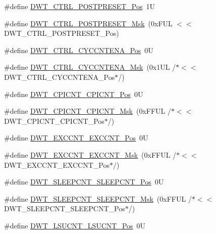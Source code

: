 \begin{DoxyCompactItemize}
\item 
\#define \mbox{\hyperlink{group__CMSIS__DWT_ga129bc152febfddd67a0c20c6814cba69}{D\+W\+T\+\_\+\+C\+T\+R\+L\+\_\+\+P\+O\+S\+T\+P\+R\+E\+S\+E\+T\+\_\+\+Pos}}~1U
\item 
\#define \mbox{\hyperlink{group__CMSIS__DWT_ga11d9e1e2a758fdd2657aa68ce61b9c9d}{D\+W\+T\+\_\+\+C\+T\+R\+L\+\_\+\+P\+O\+S\+T\+P\+R\+E\+S\+E\+T\+\_\+\+Msk}}~(0x\+F\+U\+L $<$$<$ D\+W\+T\+\_\+\+C\+T\+R\+L\+\_\+\+P\+O\+S\+T\+P\+R\+E\+S\+E\+T\+\_\+\+Pos)
\item 
\#define \mbox{\hyperlink{group__CMSIS__DWT_gaa4509f5f8514a7200be61691f0e01f10}{D\+W\+T\+\_\+\+C\+T\+R\+L\+\_\+\+C\+Y\+C\+C\+N\+T\+E\+N\+A\+\_\+\+Pos}}~0U
\item 
\#define \mbox{\hyperlink{group__CMSIS__DWT_ga4a9d209dc2a81ea6bfa0ea21331769d3}{D\+W\+T\+\_\+\+C\+T\+R\+L\+\_\+\+C\+Y\+C\+C\+N\+T\+E\+N\+A\+\_\+\+Msk}}~(0x1\+U\+L /$\ast$$<$$<$ D\+W\+T\+\_\+\+C\+T\+R\+L\+\_\+\+C\+Y\+C\+C\+N\+T\+E\+N\+A\+\_\+\+Pos$\ast$/)
\item 
\#define \mbox{\hyperlink{group__CMSIS__DWT_ga80e9ad8f6a9e2344af8a3cf989bebe3d}{D\+W\+T\+\_\+\+C\+P\+I\+C\+N\+T\+\_\+\+C\+P\+I\+C\+N\+T\+\_\+\+Pos}}~0U
\item 
\#define \mbox{\hyperlink{group__CMSIS__DWT_ga76f39e7bca3fa86a4dbf7b8f6adb7217}{D\+W\+T\+\_\+\+C\+P\+I\+C\+N\+T\+\_\+\+C\+P\+I\+C\+N\+T\+\_\+\+Msk}}~(0x\+F\+F\+U\+L /$\ast$$<$$<$ D\+W\+T\+\_\+\+C\+P\+I\+C\+N\+T\+\_\+\+C\+P\+I\+C\+N\+T\+\_\+\+Pos$\ast$/)
\item 
\#define \mbox{\hyperlink{group__CMSIS__DWT_ga031c693654030d4cba398b45d2925b1d}{D\+W\+T\+\_\+\+E\+X\+C\+C\+N\+T\+\_\+\+E\+X\+C\+C\+N\+T\+\_\+\+Pos}}~0U
\item 
\#define \mbox{\hyperlink{group__CMSIS__DWT_ga057fa604a107b58a198bbbadb47e69c9}{D\+W\+T\+\_\+\+E\+X\+C\+C\+N\+T\+\_\+\+E\+X\+C\+C\+N\+T\+\_\+\+Msk}}~(0x\+F\+F\+U\+L /$\ast$$<$$<$ D\+W\+T\+\_\+\+E\+X\+C\+C\+N\+T\+\_\+\+E\+X\+C\+C\+N\+T\+\_\+\+Pos$\ast$/)
\item 
\#define \mbox{\hyperlink{group__CMSIS__DWT_ga0371a84a7996dc5852c56afb2676ba1c}{D\+W\+T\+\_\+\+S\+L\+E\+E\+P\+C\+N\+T\+\_\+\+S\+L\+E\+E\+P\+C\+N\+T\+\_\+\+Pos}}~0U
\item 
\#define \mbox{\hyperlink{group__CMSIS__DWT_ga1e340751d71413fef400a0a1d76cc828}{D\+W\+T\+\_\+\+S\+L\+E\+E\+P\+C\+N\+T\+\_\+\+S\+L\+E\+E\+P\+C\+N\+T\+\_\+\+Msk}}~(0x\+F\+F\+U\+L /$\ast$$<$$<$ D\+W\+T\+\_\+\+S\+L\+E\+E\+P\+C\+N\+T\+\_\+\+S\+L\+E\+E\+P\+C\+N\+T\+\_\+\+Pos$\ast$/)
\item 
\#define \mbox{\hyperlink{group__CMSIS__DWT_gab9394c7911b0b4312a096dad91d53a3d}{D\+W\+T\+\_\+\+L\+S\+U\+C\+N\+T\+\_\+\+L\+S\+U\+C\+N\+T\+\_\+\+Pos}}~0U
$$
\end{DoxyCompactItemize}
